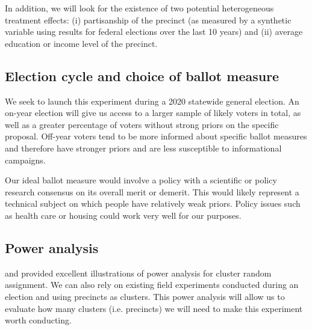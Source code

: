 \documentclass[12pt,final,fleqn]{article}
\theoremstyle{plain}
\begin{document}
In addition, we will look for the existence of two potential heterogeneous treatment effects: (i) partisanship of the precinct (as measured by a synthetic variable using results for federal elections over the last 10 years) and (ii) average education or income level of the precinct.


\subsection{Election cycle and choice of ballot measure} \label{sec:policy}

We seek to launch this experiment during a 2020 statewide general election. An on-year election will give us access to a larger sample of likely voters in total, as well as a greater percentage of voters without strong priors on the specific proposal. Off-year voters tend to be more informed about specific ballot measures and therefore have stronger priors and are less susceptible to informational campaigns. 

Our ideal ballot measure would involve a policy with a scientific or policy research consensus on its overall merit or demerit. This would likely represent a technical subject on which people have relatively weak priors. Policy issues such as health care or housing could work very well for our purposes. 






\subsection{Power analysis} \label{sec: power}
\citet{bloom1999using} and \citet{raudenbush1997statistical} provided excellent illustrations of power analysis for cluster random assignment. We can also rely on existing field experiments conducted during an election and using precincts as clusters. This power analysis will allow us to evaluate how many clusters (i.e. precincts) we will need to make this experiment worth conducting. 
\end{document}
